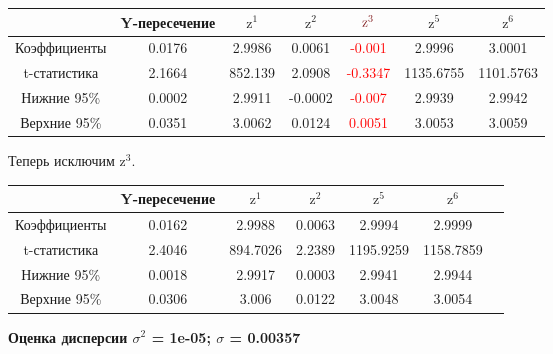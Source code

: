 \renewcommand{\arraystretch}{0.65}
\begin{center}
    \begin{tabular}{ | c | c | c | c | c | c | c | } 
      \hline
       & Y-пересечение & $\textrm{z}^1$ & $\textrm{z}^2$ & $\textcolor{RED}{\textrm{z}^3}$ & $\textrm{z}^5$ & $\textrm{z}^6$ \\
      \hline
      Коэффициенты & 0.0176 & 2.9986 & 0.0061 & \textcolor{RED}{-0.001} & 2.9996 & 3.0001 \\ 
      \hline 
      t-статистика & 2.1664 & 852.139 & 2.0908 & \textcolor{RED}{-0.3347} & 1135.6755 & 1101.5763 \\ 
      \hline 
      Нижние 95\% & 0.0002 & 2.9911 & -0.0002 & \textcolor{RED}{-0.007} & 2.9939 & 2.9942 \\ 
      \hline 
      Верхние 95\% & 0.0351 & 3.0062 & 0.0124 & \textcolor{RED}{0.0051} & 3.0053 & 3.0059 \\ 
      \hline 
    \end{tabular}
\end{center}

\vspace{1\baselineskip}

Теперь исключим $\textrm{z}^3$.

\vspace{1\baselineskip}

\renewcommand{\arraystretch}{0.65}
\begin{center}
    \begin{tabular}{ | c | c | c | c | c | c | c | } 
      \hline
       & Y-пересечение & $\textrm{z}^1$ & $\textrm{z}^2$ & $\textrm{z}^5$ & $\textrm{z}^6$ \\
      \hline
      Коэффициенты & 0.0162 & 2.9988 & 0.0063 & 2.9994 & 2.9999 \\ 
      \hline 
      t-статистика & 2.4046 & 894.7026 & 2.2389 & 1195.9259 & 1158.7859 \\ 
      \hline 
      Нижние 95\% & 0.0018 & 2.9917 & 0.0003 & 2.9941 & 2.9944 \\ 
      \hline 
      Верхние 95\% & 0.0306 & 3.006 & 0.0122 & 3.0048 & 3.0054 \\ 
      \hline 
    \end{tabular}
\end{center}

\begin{center}
    \textbf{Оценка дисперсии $\sigma^2$ = 1e-05; $\sigma$ = 0.00357}
\end{center}

